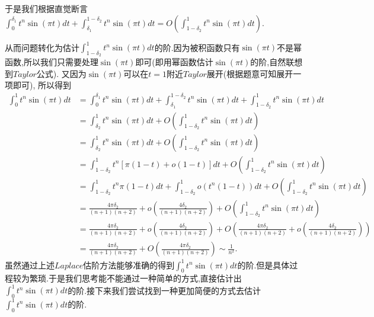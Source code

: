 \documentclass[lang=cn,newtx,10pt,scheme=chinese]{../Template/elegantbook}
\begin{document}
\begin{note}
于是我们根据直觉断言$\int_0^{\delta _1}{t^n\sin \left( \pi t \right) dt}+\int_{\delta _1}^{1-\delta _2}{t^n\sin \left( \pi t \right) dt}=O\left( \int_{1-\delta _2}^1{t^n\sin \left( \pi t \right) dt} \right)$.

从而问题转化为估计$\int_{1-\delta _2}^1{t^n\sin \left( \pi t \right) dt}$的阶.因为被积函数只有$\sin(\pi t)$不是幂函数,所以我们只需要处理$\sin(\pi t)$即可(即用幂函数估计$\sin(\pi t)$的阶,自然联想到$Taylor$公式).
又因为$\sin(\pi t)$可以在$t=1$附近$Taylor$展开(根据题意可知展开一项即可),
所以得到
\begin{align*}
\int_0^1{t^n\sin \left( \pi t \right) dt}&=\int_0^{\delta _1}{t^n\sin \left( \pi t \right) dt}+\int_{\delta _1}^{1-\delta _2}{t^n\sin \left( \pi t \right) dt}+\int_{1-\delta _2}^1{t^n\sin \left( \pi t \right) dt}
\\
&=\int_{\delta _2}^1{t^n\sin \left( \pi t \right) dt}+O\left( \int_{1-\delta _2}^1{t^n\sin \left( \pi t \right) dt} \right) 
\\
&=\int_{\delta _2}^1{t^n\sin \left( \pi t \right) dt}+O\left( \int_{1-\delta _2}^1{t^n\sin \left( \pi t \right) dt} \right) 
\\
&=\int_{1-\delta _2}^1{t^n\left[ \pi \left( 1-t \right) +o\left( 1-t \right) \right] dt}+O\left( \int_{1-\delta _2}^1{t^n\sin \left( \pi t \right) dt} \right) 
\\
&=\int_{1-\delta _2}^1{t^n\pi \left( 1-t \right) dt}+\int_{1-\delta _2}^1{o\left( t^n\left( 1-t \right) \right) dt}+O\left( \int_{1-\delta _2}^1{t^n\sin \left( \pi t \right) dt} \right) 
\\
&=\frac{4\pi \delta _2}{\left( n+1 \right) \left( n+2 \right)}+o\left( \frac{4\delta _2}{\left( n+1 \right) \left( n+2 \right)} \right) +O\left( \int_{1-\delta _2}^1{t^n\sin \left( \pi t \right) dt} \right) 
\\
&=\frac{4\pi \delta _2}{\left( n+1 \right) \left( n+2 \right)}+o\left( \frac{4\delta _2}{\left( n+1 \right) \left( n+2 \right)} \right) +O\left( \frac{4\pi \delta _2}{\left( n+1 \right) \left( n+2 \right)}+o\left( \frac{4\delta _2}{\left( n+1 \right) \left( n+2 \right)} \right) \right) 
\\
&=\frac{4\pi \delta _2}{\left( n+1 \right) \left( n+2 \right)}+O\left( \frac{4\pi \delta _2}{\left( n+1 \right) \left( n+2 \right)} \right) \sim \frac{1}{n^2}.
\end{align*}
虽然通过上述$Laplace$估阶方法能够准确的得到$\int_0^1{t^n\sin \left( \pi t \right) dt}$的阶.但是具体过程较为繁琐.于是我们思考能不能通过一种简单的方式,直接估计出$\int_0^1{t^n\sin \left( \pi t \right) dt}$的阶.接下来我们尝试找到一种更加简便的方式去估计$\int_0^1{t^n\sin \left( \pi t \right) dt}$的阶.


\end{note}
\end{document}
